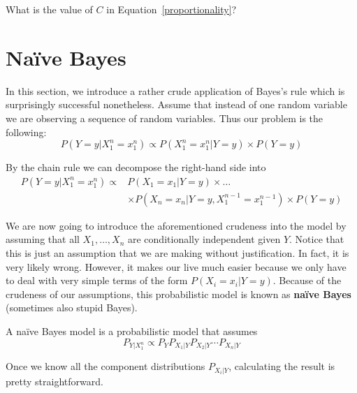\begin{Exercise}
What is the value of $ C $ in Equation~\eqref{proportionality}?
\end{Exercise}



\section{Na\"ive Bayes}
In this section, we introduce a rather crude application of Bayes's rule which is surprisingly successful nonetheless.
Assume that instead of one random variable we are observing a sequence of random variables. Thus our problem is the following:
\begin{equation}
P(Y=y|X_{1}^{n}=x_{1}^{n}) \propto P(X_{1}^{n}=x_{1}^{n}|Y=y) \times P(Y=y) 
\end{equation}

By the chain rule we can decompose the right-hand side into
\begin{align}
P(Y=y|X_{1}^{n}=x_{1}^{n})
\propto &P(X_{1}=x_{1}|Y=y) \times \ldots \nonumber \\
&\times P(X_{n}=x_{n}|Y=y,X_{1}^{n-1}=x_1^{n-1}) \times P(Y=y) \nonumber
\end{align}

We are now going to introduce the aforementioned crudeness into the model by assuming that all $ X_1,\ldots,X_n$ are conditionally independent given $ Y $. Notice that
this is just an assumption that we are making without justification. In fact, it is very likely wrong. However, it makes our
live much easier because we only have to deal with very simple terms of the form $ P(X_{i}=x_{i}|Y=y) $. Because of the
crudeness of our assumptions, this probabilistic model is known as \textbf{na\"ive Bayes} (sometimes also 
stupid Bayes).

\begin{Definition}
A na\"ive Bayes model is a probabilistic model that assumes
$$ P_{Y|X_{1}^{n}} \propto P_Y P_{X_{1}|Y} P_{X_{2}|Y} \cdots P_{X_{n}|Y} $$
\end{Definition}
Once we know all the component distributions $P_{X_i|Y}$, calculating the result is pretty straightforward. 

